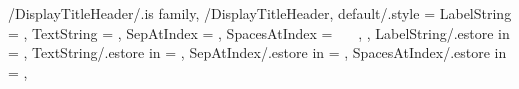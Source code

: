 %
%
%
%
%



\newcommand{\VarChapterHeaderSeparatorInToc}{.} %
\newcommand{\SetChapterTitleIndexSep}[1]{%
  \renewcommand{\VarChapterHeaderSeparatorInToc}{#1}}

\newcommand{\VarSectionHeaderSeparatorInToc}{.} %
\newcommand{\SetSectionTitleIndexSep}[1]{%
  \renewcommand{\VarSectionHeaderSeparatorInToc}{#1}}

\newcommand{\VarSubSectionHeaderSeparatorInToc}{.} %
\newcommand{\SetSubSectionTitleIndexSep}[1]{%
  \renewcommand{\VarSubSectionHeaderSeparatorInToc}{#1}}

\newcommand{\VarSubSubSectionHeaderSeparatorInToc}{.} %
\newcommand{\SetSubSubSectionTitleIndexSep}[1]{%
  \renewcommand{\VarSubSubSectionHeaderSeparatorInToc}{#1}}


\pgfkeys
{
  /DisplayTitleHeader/.is family, /DisplayTitleHeader,
  default/.style =
  {
    LabelString = \empty,
    TextString = \empty,
    SepAtIndex = \empty,
    SpacesAtIndex = {\ \ \ },
  },
  LabelString/.estore in = \TmpValueLabelString,
  TextString/.estore in = \TmpValueTextString,
  SepAtIndex/.estore in = \TmpValueSepAtIndex,
  SpacesAtIndex/.estore in = \TmpValueSpacesAtIndex,
} %

